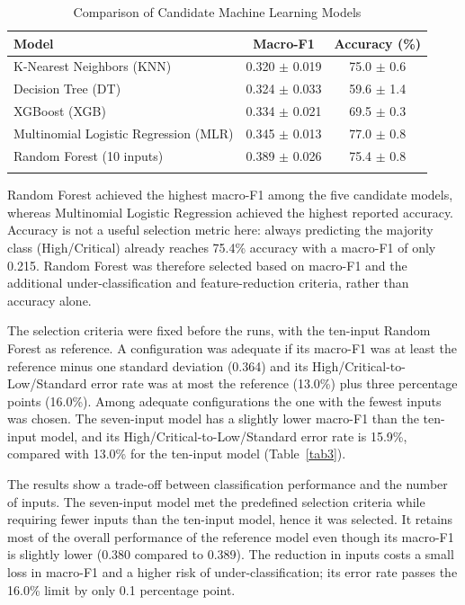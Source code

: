\documentclass[pdflatex,sn-mathphys-num]{sn-jnl}
\begin{document}
\begin{table}[h]
\caption{Comparison of Candidate Machine Learning Models}\label{tab2}
\begin{tabular}{@{}lcc@{}}
\toprule
Model & Macro-F1 & Accuracy (\%) \\
\midrule
K-Nearest Neighbors (KNN) & 0.320 $\pm$ 0.019 & 75.0 $\pm$ 0.6 \\
Decision Tree (DT) & 0.324 $\pm$ 0.033 & 59.6 $\pm$ 1.4 \\
XGBoost (XGB) & 0.334 $\pm$ 0.021 & 69.5 $\pm$ 0.3 \\
Multinomial Logistic Regression (MLR) & 0.345 $\pm$ 0.013 & 77.0 $\pm$ 0.8 \\
Random Forest (10 inputs) & 0.389 $\pm$ 0.026 & 75.4 $\pm$ 0.8 \\
\botrule
\end{tabular}
\end{table}

Random Forest achieved the highest macro-F1 among the five candidate models, whereas Multinomial
Logistic Regression achieved the highest reported accuracy. Accuracy is not a useful selection
metric here: always predicting the majority class (High/Critical) already reaches 75.4\% accuracy
with a macro-F1 of only 0.215. Random Forest was therefore selected based on macro-F1 and the
additional under-classification and feature-reduction criteria, rather than accuracy alone.

The selection criteria were fixed before the runs, with the ten-input Random Forest as reference.
A configuration was adequate if its macro-F1 was at least the reference minus one standard
deviation (0.364) and its High/Critical-to-Low/Standard error rate was at most the reference
(13.0\%) plus three percentage points (16.0\%). Among adequate configurations the one with the
fewest inputs was chosen. The seven-input model has a slightly lower macro-F1 than the ten-input
model, and its High/Critical-to-Low/Standard error rate is 15.9\%, compared with 13.0\% for the
ten-input model (Table~\ref{tab3}).

The results show a trade-off between classification performance and the number of inputs. The
seven-input model met the predefined selection criteria while requiring fewer inputs than the
ten-input model, hence it was selected. It retains most of the overall performance of the
reference model even though its macro-F1 is slightly lower (0.380 compared to 0.389). The
reduction in inputs costs a small loss in macro-F1 and a higher risk of under-classification; its
error rate passes the 16.0\% limit by only 0.1 percentage point.
\end{document}
